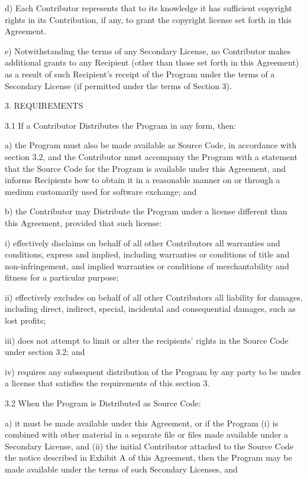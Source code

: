 d) Each Contributor represents that to its knowledge it has
sufficient copyright rights in its Contribution, if any, to grant
the copyright license set forth in this Agreement.

e) Notwithstanding the terms of any Secondary License, no
Contributor makes additional grants to any Recipient (other than
those set forth in this Agreement) as a result of such Recipient's
receipt of the Program under the terms of a Secondary License
(if permitted under the terms of Section 3).

3. REQUIREMENTS

3.1 If a Contributor Distributes the Program in any form, then:

a) the Program must also be made available as Source Code, in
accordance with section 3.2, and the Contributor must accompany
the Program with a statement that the Source Code for the Program
is available under this Agreement, and informs Recipients how to
obtain it in a reasonable manner on or through a medium customarily
used for software exchange; and

b) the Contributor may Distribute the Program under a license
different than this Agreement, provided that such license:

i) effectively disclaims on behalf of all other Contributors all
warranties and conditions, express and implied, including
warranties or conditions of title and non-infringement, and
implied warranties or conditions of merchantability and fitness
for a particular purpose;

ii) effectively excludes on behalf of all other Contributors all
liability for damages, including direct, indirect, special,
incidental and consequential damages, such as lost profits;

iii) does not attempt to limit or alter the recipients' rights
in the Source Code under section 3.2; and

iv) requires any subsequent distribution of the Program by any
party to be under a license that satisfies the requirements
of this section 3.

3.2 When the Program is Distributed as Source Code:

a) it must be made available under this Agreement, or if the
Program (i) is combined with other material in a separate file or
files made available under a Secondary License, and (ii) the initial
Contributor attached to the Source Code the notice described in
Exhibit A of this Agreement, then the Program may be made available
under the terms of such Secondary Licenses, and

